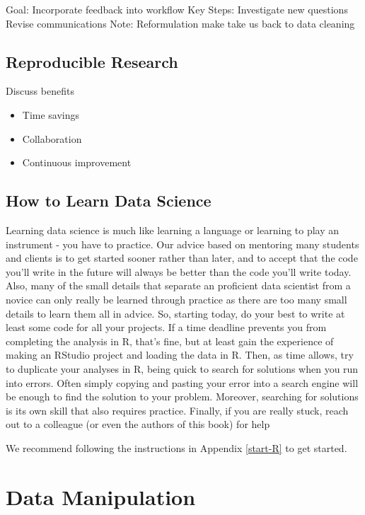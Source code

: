 \documentclass[
]{book}
\providecommand{\tightlist}{%
  \setlength{\itemsep}{0pt}\setlength{\parskip}{0pt}}
\begin{document}
Goal:
Incorporate feedback into workflow
Key Steps:
Investigate new questions
Revise communications
Note:
Reformulation make take us back to data cleaning

\hypertarget{reproducible-research-1}{%
\section{Reproducible Research}\label{reproducible-research-1}}

Discuss benefits

\begin{itemize}
\tightlist
\item
  Time savings
\item
  Collaboration
\item
  Continuous improvement
\end{itemize}

\hypertarget{how-to-learn-data-science}{%
\section{How to Learn Data Science}\label{how-to-learn-data-science}}

Learning data science is much like learning a language or learning to play an instrument - you have to practice. Our advice based on mentoring many students and clients is to get started sooner rather than later, and to accept that the code you'll write in the future will always be better than the code you'll write today. Also, many of the small details that separate an proficient data scientist from a novice can only really be learned through practice as there are too many small details to learn them all in advice. So, starting today, do your best to write at least some code for all your projects. If a time deadline prevents you from completing the analysis in R, that's fine, but at least gain the experience of making an RStudio project and loading the data in R. Then, as time allows, try to duplicate your analyses in R, being quick to search for solutions when you run into errors. Often simply copying and pasting your error into a search engine will be enough to find the solution to your problem. Moreover, searching for solutions is its own skill that also requires practice. Finally, if you are really stuck, reach out to a colleague (or even the authors of this book) for help

We recommend following the instructions in Appendix \ref{start-R} to get started.

\hypertarget{data-manip}{%
\chapter{Data Manipulation}\label{data-manip}}
\end{document}
